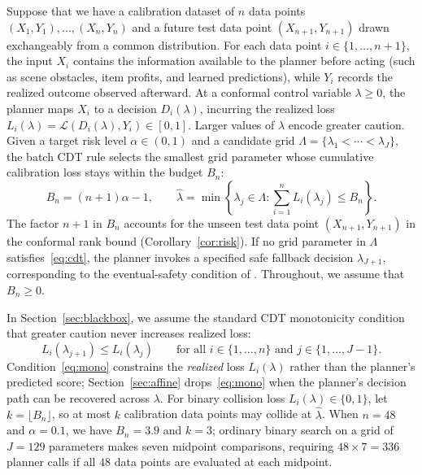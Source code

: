 \documentclass[a4paper,10pt]{article}
\theoremstyle{plain}
\theoremstyle{remark}
\begin{document}
Suppose that we have a calibration dataset of $n$ data points $(X_1,Y_1),\ldots,(X_n,Y_n)$ and a future test data point $(X_{n+1},Y_{n+1})$ drawn exchangeably from a common distribution. For each data point $i\in\{1,\ldots,n+1\}$, the input $X_i$ contains the information available to the planner before acting (such as scene obstacles, item profits, and learned predictions), while $Y_i$ records the realized outcome observed afterward. At a conformal control variable $\lambda\ge0$, the planner maps $X_i$ to a decision $D_i(\lambda)$, incurring the realized loss $L_i(\lambda)=\mathcal L(D_i(\lambda),Y_i)\in[0,1]$. Larger values of $\lambda$ encode greater caution. Given a target risk level $\alpha\in(0,1)$ and a candidate grid $\Lambda=\{\lambda_1<\cdots<\lambda_J\}$, the batch CDT rule \cite{cdt,crc} selects the smallest grid parameter whose cumulative calibration loss stays within the budget $B_n$:
\begin{equation}\label{eq:cdt}
 B_n=(n+1)\alpha-1,\qquad
 \widehat\lambda=\min\left\{\lambda_j\in\Lambda:\sum_{i=1}^{n} L_i(\lambda_j)\le B_n\right\}.
\end{equation}
The factor $n+1$ in $B_n$ accounts for the unseen test data point $(X_{n+1},Y_{n+1})$ in the conformal rank bound (Corollary~\ref{cor:risk}). If no grid parameter in $\Lambda$ satisfies~\eqref{eq:cdt}, the planner invokes a specified safe fallback decision $\lambda_{J+1}$, corresponding to the eventual-safety condition of \cite{cdt}. Throughout, we assume that $B_n\ge0$.

In Section~\ref{sec:blackbox}, we assume the standard CDT monotonicity condition \cite{cdt,crc} that greater caution never increases realized loss:
\begin{equation}\label{eq:mono}
 L_i(\lambda_{j+1})\le L_i(\lambda_j)\qquad\text{for all }i\in\{1,\ldots,n\}\text{ and }j\in\{1,\ldots,J-1\}.
\end{equation}
Condition~\eqref{eq:mono} constrains the \emph{realized} loss $L_i(\lambda)$ rather than the planner's predicted score; Section~\ref{sec:affine} drops~\eqref{eq:mono} when the planner's decision path can be recovered across $\lambda$. For binary collision loss $L_i(\lambda)\in\{0,1\}$, let $k=\lfloor B_n\rfloor$, so at most $k$ calibration data points may collide at $\widehat\lambda$. When $n=48$ and $\alpha=0.1$, we have $B_n=3.9$ and $k=3$; ordinary binary search on a grid of $J=129$ parameters makes seven midpoint comparisons, requiring $48\times 7=336$ planner calls if all $48$ data points are evaluated at each midpoint.
\end{document}
